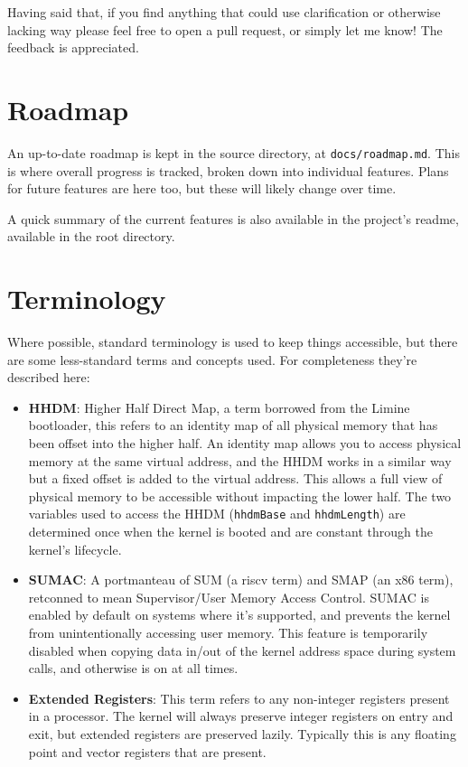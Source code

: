 Having said that, if you find anything that could use clarification or otherwise lacking way please feel free to open a pull request, or simply let me know! The feedback is appreciated.

\section{Roadmap}
An up-to-date roadmap is kept in the source directory, at \verb|docs/roadmap.md|. This is where overall progress is tracked, broken down into individual features. Plans for future features are here too, but these will likely change over time.

A quick summary of the current features is also available in the project's readme, available in the root directory.

\section{Terminology}
Where possible, standard terminology is used to keep things accessible, but there are some less-standard terms and concepts used. For completeness they're described here:

\begin{itemize}
    \item \textbf{HHDM}: Higher Half Direct Map, a term borrowed from the Limine bootloader, this refers to an identity map of all physical memory that has been offset into the higher half. An identity map allows you to access physical memory at the same virtual address, and the HHDM works in a similar way but a fixed offset is added to the virtual address. This allows a full view of physical memory to be accessible without impacting the lower half. The two variables used to access the HHDM (\verb|hhdmBase| and \verb|hhdmLength|) are determined once when the kernel is booted and are constant through the kernel's lifecycle.
    \item \textbf{SUMAC}: A portmanteau of SUM (a riscv term) and SMAP (an x86 term), retconned to mean Supervisor/User Memory Access Control. SUMAC is enabled by default on systems where it's supported, and prevents the kernel from unintentionally accessing user memory. This feature is temporarily disabled when copying data in/out of the kernel address space during system calls, and otherwise is on at all times.
    \item \textbf{Extended Registers}: This term refers to any non-integer registers present in a processor. The kernel will always preserve integer registers on entry and exit, but extended registers are preserved lazily. Typically this is any floating point and vector registers that are present.
\end{itemize}
